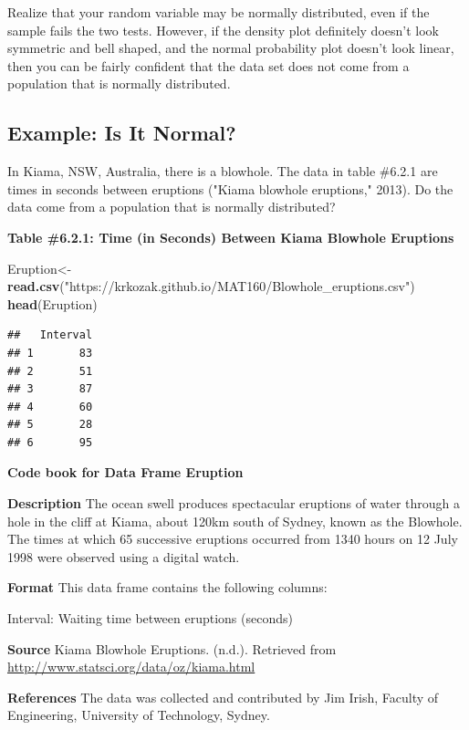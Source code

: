 \documentclass[
]{book}
\newenvironment{Shaded}{\begin{snugshade}}{\end{snugshade}}
\newcommand{\KeywordTok}[1]{\textcolor[rgb]{0.13,0.29,0.53}{\textbf{#1}}}
\newcommand{\NormalTok}[1]{#1}
\newcommand{\StringTok}[1]{\textcolor[rgb]{0.31,0.60,0.02}{#1}}
\begin{document}
Realize that your random variable may be normally distributed, even if the sample fails the two tests. However, if the density plot definitely doesn't look symmetric and bell shaped, and the normal probability plot doesn't look linear, then you can be fairly confident that the data set does not come from a population that is normally distributed.

\hypertarget{example-is-it-normal}{%
\subsection{Example: Is It Normal?}\label{example-is-it-normal}}

In Kiama, NSW, Australia, there is a blowhole. The data in table \#6.2.1 are times in seconds between eruptions ("Kiama blowhole eruptions," 2013). Do the data come from a population that is normally distributed?

\textbf{Table \#6.2.1: Time (in Seconds) Between Kiama Blowhole Eruptions }

\begin{Shaded}
\begin{Highlighting}[]
\NormalTok{Eruption<-}\KeywordTok{read.csv}\NormalTok{(}\StringTok{"https://krkozak.github.io/MAT160/Blowhole_eruptions.csv"}\NormalTok{)}
\KeywordTok{head}\NormalTok{(Eruption)}
\end{Highlighting}
\end{Shaded}

\begin{verbatim}
##   Interval
## 1       83
## 2       51
## 3       87
## 4       60
## 5       28
## 6       95
\end{verbatim}

\textbf{Code book for Data Frame Eruption}

\textbf{Description}
The ocean swell produces spectacular eruptions of water through a hole in the cliff at Kiama, about 120km south of Sydney, known as the Blowhole. The times at which 65 successive eruptions occurred from 1340 hours on 12 July 1998 were observed using a digital watch.

\textbf{Format}
This data frame contains the following columns:

Interval: Waiting time between eruptions (seconds)

\textbf{Source}
Kiama Blowhole Eruptions. (n.d.). Retrieved from \url{http://www.statsci.org/data/oz/kiama.html}

\textbf{References}
The data was collected and contributed by Jim Irish, Faculty of Engineering, University of Technology, Sydney.
\end{document}
